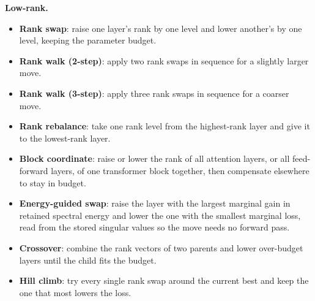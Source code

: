 \documentclass[10pt,twocolumn]{article}
\begin{document}
\textbf{Low-rank.}
\begin{itemize}[leftmargin=1.1em,itemsep=1pt,topsep=1pt]
\item \textbf{Rank swap}: raise one layer's rank by one level and lower another's by one level, keeping the parameter budget.
\item \textbf{Rank walk (2-step)}: apply two rank swaps in sequence for a slightly larger move.
\item \textbf{Rank walk (3-step)}: apply three rank swaps in sequence for a coarser move.
\item \textbf{Rank rebalance}: take one rank level from the highest-rank layer and give it to the lowest-rank layer.
\item \textbf{Block coordinate}: raise or lower the rank of all attention layers, or all feed-forward layers, of one transformer block together, then compensate elsewhere to stay in budget.
\item \textbf{Energy-guided swap}: raise the layer with the largest marginal gain in retained spectral energy and lower the one with the smallest marginal loss, read from the stored singular values so the move needs no forward pass.
\item \textbf{Crossover}: combine the rank vectors of two parents and lower over-budget layers until the child fits the budget.
\item \textbf{Hill climb}: try every single rank swap around the current best and keep the one that most lowers the loss.
\end{itemize}
\end{document}
